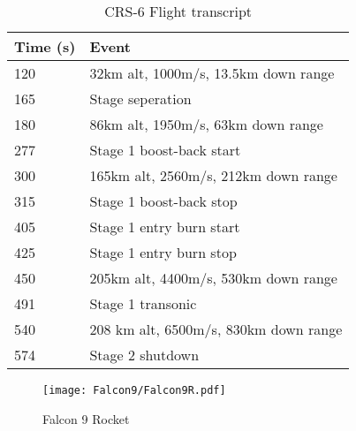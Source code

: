 \begin{table}[!htb]
\centering
\begin{tabular}{|l|l|}
\hline
\rowcolor[HTML]{C0C0C0} 
Time (s) & Event                                 \\ \hline
120      & 32km alt, 1000m/s, 13.5km down range  \\ \hline
\rowcolor[HTML]{EFEFEF} 
165      & Stage seperation                      \\ \hline
180      & 86km alt, 1950m/s, 63km down range    \\ \hline
\rowcolor[HTML]{EFEFEF} 
277      & Stage 1 boost-back start              \\ \hline
300      & 165km alt, 2560m/s, 212km down range  \\ \hline
\rowcolor[HTML]{EFEFEF} 
315      & Stage 1 boost-back stop               \\ \hline
405      & Stage 1 entry burn start              \\ \hline
\rowcolor[HTML]{EFEFEF} 
425      & Stage 1 entry burn stop               \\ \hline
450      & 205km alt, 4400m/s, 530km down range  \\ \hline
\rowcolor[HTML]{EFEFEF} 
491      & Stage 1 transonic                     \\ \hline
540      & 208 km alt, 6500m/s, 830km down range \\ \hline
\rowcolor[HTML]{EFEFEF} 
574      & Stage 2 shutdown \\ \hline
\end{tabular}
\caption{CRS-6 Flight transcript \cite{CRS6}}
\label{tab:CRS6}
\end{table}



\begin{figure}[!htb]
\centering
\texttt{[image: Falcon9/Falcon9R.pdf]}
\caption{Falcon 9 Rocket}
\label{fig:Rocket}
\end{figure}

